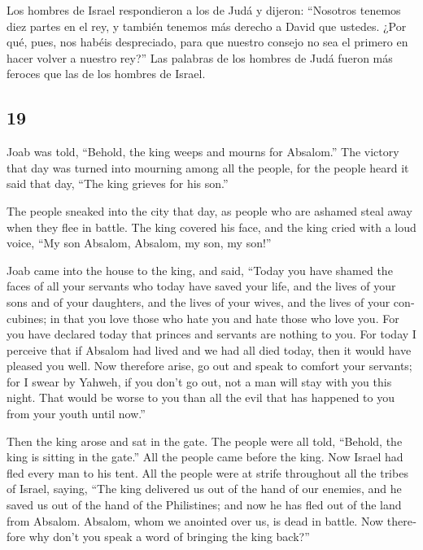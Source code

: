 \begin{paracol}{2}
 Los hombres de Israel respondieron a los de Judá y
dijeron: ``Nosotros tenemos diez partes en el rey, y también tenemos más
derecho a David que ustedes. ¿Por qué, pues, nos habéis despreciado,
para que nuestro consejo no sea el primero en hacer volver a nuestro
rey?'' Las palabras de los hombres de Judá fueron más feroces que las de
los hombres de Israel.

\switchcolumn
\begin{otherlanguage}{english}

\hypertarget{section-37}{%
\section{19}\label{section-37}}

 Joab was told, ``Behold, the king weeps and mourns for
Absalom.''  The victory that day was turned into mourning
among all the people, for the people heard it said that day, ``The king
grieves for his son.''

 The people sneaked into the city that day, as people who
are ashamed steal away when they flee in battle.  The king
covered his face, and the king cried with a loud voice, ``My son
Absalom, Absalom, my son, my son!''

 Joab came into the house to the king, and said, ``Today
you have shamed the faces of all your servants who today have saved your
life, and the lives of your sons and of your daughters, and the lives of
your wives, and the lives of your concubines;  in that you
love those who hate you and hate those who love you. For you have
declared today that princes and servants are nothing to you. For today I
perceive that if Absalom had lived and we had all died today, then it
would have pleased you well.  Now therefore arise, go out
and speak to comfort your servants; for I swear by Yahweh, if you don't
go out, not a man will stay with you this night. That would be worse to
you than all the evil that has happened to you from your youth until
now.''

 Then the king arose and sat in the gate. The people were
all told, ``Behold, the king is sitting in the gate.'' All the people
came before the king. Now Israel had fled every man to his tent.
 All the people were at strife throughout all the tribes
of Israel, saying, ``The king delivered us out of the hand of our
enemies, and he saved us out of the hand of the Philistines; and now he
has fled out of the land from Absalom.  Absalom, whom we
anointed over us, is dead in battle. Now therefore why don't you speak a
word of bringing the king back?''


\end{otherlanguage}
\end{paracol}
